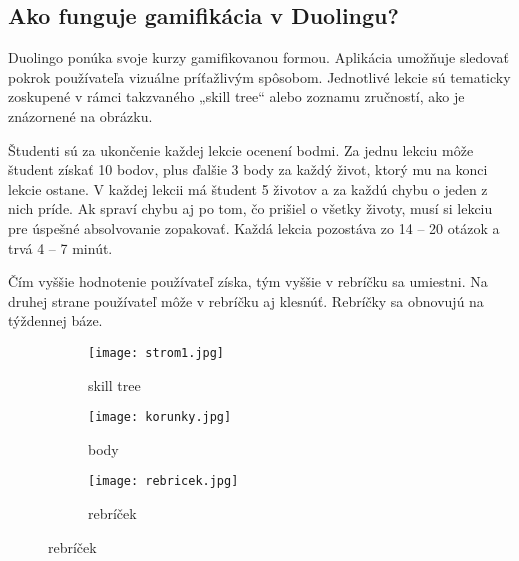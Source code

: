 \documentclass[10pt,twoside,slovak,a4paper]{article}
\begin{document}
\subsection{Ako funguje gamifikácia v Duolingu?} \label{Duolingo:Ako funguje gamifikácia v Duolingu?}
Duolingo ponúka svoje kurzy gamifikovanou formou. Aplikácia umožňuje sledovať pokrok používateľa vizuálne príťažlivým spôsobom\cite{HadiMogavi2022}. Jednotlivé lekcie sú tematicky zoskupené v rámci takzvaného „skill tree“ alebo zoznamu zručností, ako je znázornené na obrázku. \cite{Duolingo} %

Študenti sú za ukončenie každej lekcie ocenení bodmi. Za jednu lekciu môže študent získať 10 bodov, plus ďalšie 3 body za každý život, ktorý mu na konci lekcie ostane. V každej lekcii má študent 5 životov a za každú chybu o jeden z nich príde. Ak spraví chybu aj po tom, čo prišiel o všetky životy, musí si lekciu pre úspešné absolvovanie zopakovať. Každá lekcia pozostáva zo 14 – 20 otázok a trvá 4 – 7 minút. \cite{Duolingo} 

Čím vyššie hodnotenie používateľ získa, tým vyššie v rebríčku sa umiestni. Na druhej strane používateľ môže v rebríčku aj klesnúť. Rebríčky sa obnovujú na týždennej báze.\cite{HadiMogavi2022}


\begin{figure}[H]
	\begin{subfigure}[b]{0.3\textwidth}
		\centering
		\texttt{[image: strom1.jpg]}
		\caption{skill tree\cite{screenshot}}
	\end{subfigure}
	\begin{subfigure}[b]{0.3\textwidth}
		\centering
		\texttt{[image: korunky.jpg]}
		\caption{body\cite{screenshot}}
	\end{subfigure}
	\begin{subfigure}[b]{0.3\textwidth}
		\centering
		\texttt{[image: rebricek.jpg]}
		\caption{rebríček\cite{screenshot}}
	\end{subfigure}
\end{figure}





\end{document}
